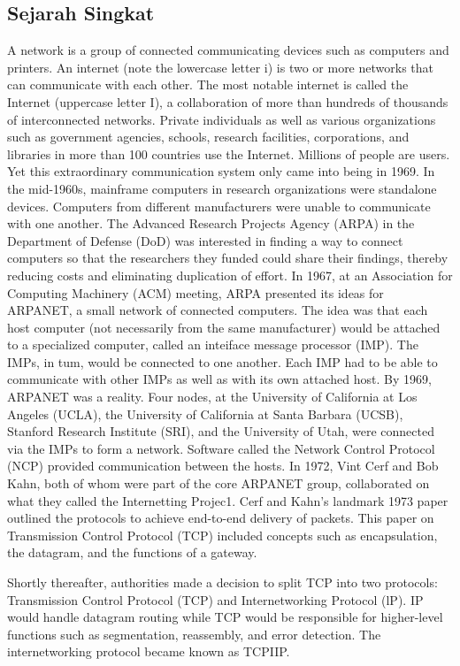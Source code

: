 \subsection{Sejarah Singkat}
A network is a group of connected communicating devices such as computers and printers. An internet (note the lowercase letter i) is two or more networks that can communicate with each other. The most notable internet is called the Internet (uppercase letter I), a collaboration of more than hundreds of thousands of interconnected networks. Private individuals as well as various organizations such as government agencies, schools, research facilities, corporations, and libraries in more than 100 countries use the Internet. Millions of people are users. Yet this extraordinary communication system only came into being in 1969. In the mid-1960s, mainframe computers in research organizations were standalone devices. Computers from different manufacturers were unable to communicate with one another. The Advanced Research Projects Agency (ARPA) in the Department of Defense (DoD) was interested in finding a way to connect computers so that the researchers they funded could share their findings, thereby reducing costs and eliminating duplication of effort. In 1967, at an Association for Computing Machinery (ACM) meeting, ARPA presented its ideas for ARPANET, a small network of connected computers. The idea was that each host computer (not necessarily from the same manufacturer) would be attached to a specialized computer, called an inteiface message processor (IMP). The IMPs, in tum, would be connected to one another. Each IMP had to be able to communicate with other IMPs as well as with its own attached host. By 1969, ARPANET was a reality. Four nodes, at the University of California at Los Angeles (UCLA), the University of California at Santa Barbara (UCSB), Stanford Research Institute (SRI), and the University of Utah, were connected via the IMPs to form a network. Software called the Network Control Protocol (NCP) provided communication between the hosts. In 1972, Vint Cerf and Bob Kahn, both of whom were part of the core ARPANET group, collaborated on what they called the Internetting Projec1. Cerf and Kahn's landmark 1973 paper outlined the protocols to achieve end-to-end delivery of packets. This paper on Transmission Control Protocol (TCP) included concepts such as encapsulation, the datagram, and the functions of a gateway.

Shortly thereafter, authorities made a decision to split TCP into two protocols: Transmission Control Protocol (TCP) and Internetworking Protocol (lP). IP would handle datagram routing while TCP would be responsible for higher-level functions such as segmentation, reassembly, and error detection. The internetworking protocol became known as TCPIIP.

